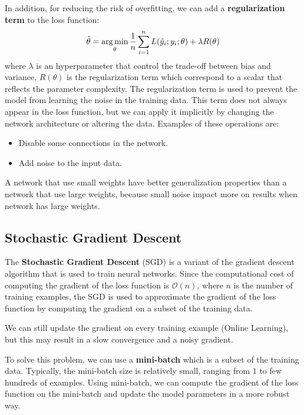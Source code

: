In addition, for reducing the risk of overfitting, we can add a \textbf{regularization
    term} to the loss function:
\begin{equation}
    \hat{\theta} = \operatorname*{arg\,min}_{\theta} \frac{1}{n} \sum_{i=1}^n L(\hat{y}_i; y_i; \theta)
    + \lambda R(\theta)
\end{equation}
where $\lambda$ is an hyperparameter that control the trade-off between bias and
variance, $R(\theta)$ is the regularization term which correspond to a scalar that
reflects the parameter complexity. The regularization term is used to prevent the
model from learning the noise in the training data. This term does not always
appear in the loss function, but we can apply it implicitly by changing the
network architecture or altering the data. Examples of these operations are:
\begin{itemize}
    \item Disable some connections in the network.
    \item Add noise to the input data.
\end{itemize}
\begin{note}
    A network that use small weights have better generalization properties than
    a network that use large weights, because small noise impact more on results
    when network has large weights.
\end{note}
\subsection{Stochastic Gradient Descent}
The \textbf{Stochastic Gradient Descent} (SGD) is a variant of the gradient descent
algorithm that is used to train neural networks. Since the computational cost
of computing the gradient of the loss function is $\mathcal{O}(n)$, where $n$ is
the number of training examples, the SGD is used to approximate the gradient of
the loss function by computing the gradient on a subset of the training data.

We can still update the gradient on every training example (Online Learning), but
this may result in a slow convergence and a noisy gradient.

To solve this problem, we can use a \textbf{mini-batch} which is a subset of the
training data. Typically, the mini-batch size is relatively small, ranging from
$1$ to few hundreds of examples. Using mini-batch, we can compute the gradient
of the loss function on the mini-batch and update the model parameters in a more
robust way.

